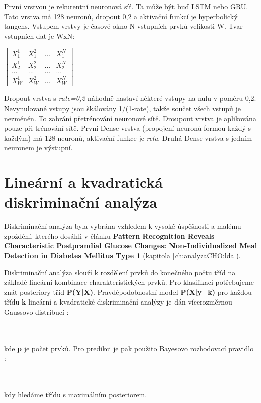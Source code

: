 První vrstvou je rekurentní neuronová síť. Ta může být buď LSTM nebo GRU. Tato vrstva má 128 neuronů, dropout 0,2 a aktivační funkcí je hyperbolický tangens. Vstupem vrstvy je časové okno N vstupních prvků velikosti W. Tvar vstupních dat je WxN:

$\begin{bmatrix}
X^{1}_{1} & X^{2}_{1} & ... & X^{N}_{1}\\
X^{1}_{2} & X^{2}_{2} & ... & X^{N}_{2}\\
... & ... & ... & ...\\
X^{1}_{W} & X^{2}_{W} & ... & X^{N}_{W}
\end{bmatrix}$

Dropout vrstva s \textit{rate=0,2} náhodně nastaví některé vstupy na nulu v poměru 0,2. Nevynulované vstupy jsou škálovány 1/(1-rate), takže součet všech vstupů je nezměněn. To zabrání přetrénování neuronové sítě. Droupout vrstva je aplikována pouze při trénování sítě. První Dense vrstva (propojení neuronů formou každý s každým) má 128 neuronů, aktivační funkce je \textit{relu}. Druhá Dense vrstva s jedním neuronem je výstupní.


\section{Lineární a kvadratická diskriminační analýza}
\label{ch:lda_qda}

Diskriminační analýza byla vybrána vzhledem k vysoké úspěšnosti a malému zpoždění, kterého dosáhli \citet{analyzaCHO.LDA} v článku \textbf{Pattern Recognition Reveals Characteristic Postprandial Glucose Changes: Non-Individualized Meal Detection in Diabetes Mellitus Type 1} (kapitola \ref{ch:analyzaCHO:lda}).

Diskriminační analýza slouží k rozdělení prvků do konečného počtu tříd na základě lineární kombinace charakteristických prvků. Pro klasifikaci potřebujeme znát posteriory tříd \textbf{P(Y|X)}. Pravděpodobnostní model \textbf{P(X|y=k)} pro každou třídu \textbf{k} lineární a kvadratické diskriminační analýzy je dán vícerozměrnou Gaussovo distribucí \citep{cho.book.lda}:

\\\\
kde \textbf{p} je počet prvků. Pro predikci je pak použito Bayesovo rozhodovací pravidlo \citep{cho.book.lda}:

\\\\
kdy hledáme třídu s maximálním posteriorem.

